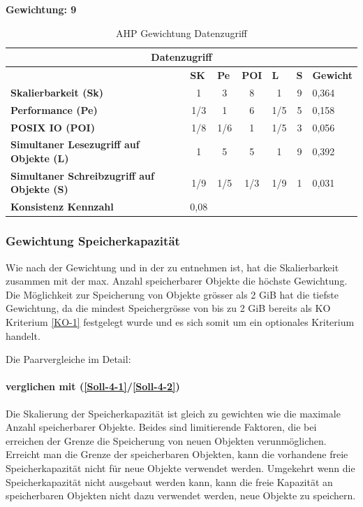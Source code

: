 \textbf{Gewichtung: 9}

\begin{table}[htbp]
\caption{AHP Gewichtung Datenzugriff}
\begin{tabular}{|l|c|c|c|c|c|l|}
\hline
\multicolumn{ 7}{|c|}{\textbf{Datenzugriff}} \\ \hline
 & \multicolumn{1}{l|}{\textbf{SK}} & \multicolumn{1}{l|}{\textbf{Pe}} & \multicolumn{1}{l|}{\textbf{POI}} & \multicolumn{1}{l|}{\textbf{L}} & \multicolumn{1}{l|}{\textbf{S}} & \multicolumn{1}{l|}{\textbf{Gewicht}} \\ \hline
\textbf{Skalierbarkeit (Sk)} & 1 & 3 & 8 & 1 & 9 & 0,364 \\ \hline
\textbf{Performance (Pe)} & 1/3 & 1 & 6 & 1/5 & 5 & 0,158 \\ \hline
\textbf{POSIX IO (POI)} & 1/8 & 1/6 & 1 & 1/5 & 3 & 0,056 \\ \hline
\textbf{Simultaner Lesezugriff auf Objekte (L)} & 1 & 5 & 5 & 1 & 9 & 0,392 \\ \hline
\textbf{Simultaner Schreibzugriff auf Objekte (S)} & 1/9 & 1/5 & 1/3 & 1/9 & 1 & 0,031 \\ \hline
\textbf{Konsistenz Kennzahl} & 0,08 \\ \cline{1-2}
\end{tabular}
\label{tab:AHPDatenzugriff}
\end{table}

\subsubsection*{Gewichtung Speicherkapazität}


Wie nach der Gewichtung und in der  zu entnehmen ist, hat die Skalierbarkeit zusammen mit der max. Anzahl speicherbarer Objekte die höchste Gewichtung. Die Möglichkeit zur Speicherung von Objekte grösser als 2 GiB hat die tiefste Gewichtung, da die mindest Speichergrösse von bis zu 2 GiB bereits als KO Kriterium \ref{KO-1} festgelegt wurde und es sich somit um ein optionales Kriterium handelt.

Die Paarvergleiche im Detail:

\paragraph*{ verglichen mit  (\ref{Soll-4-1}/\ref{Soll-4-2})}
Die Skalierung der Speicherkapazität ist gleich zu gewichten wie die maximale Anzahl speicherbarer Objekte. Beides sind limitierende Faktoren, die bei erreichen der Grenze die Speicherung von neuen Objekten verunmöglichen. Erreicht man die Grenze der speicherbaren Objekten, kann die vorhandene freie Speicherkapazität nicht für neue Objekte verwendet werden. Umgekehrt wenn die Speicherkapazität nicht ausgebaut werden kann, kann die freie Kapazität an speicherbaren Objekten nicht dazu verwendet werden, neue Objekte zu speichern.

